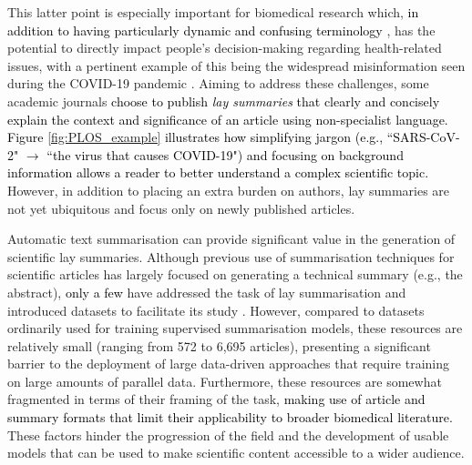 \documentclass[11pt]{article}
\begin{document}
This latter point is especially important for biomedical research which, \textcolor{black}{in addition to having particularly dynamic and confusing terminology \citep{SMITH2006288,peng2021named}}, has the potential to directly impact people's decision-making regarding health-related issues, with a pertinent example of this being the widespread misinformation seen during the COVID-19 pandemic \citep{Islam2020}.
Aiming to address these challenges, some academic journals 
\textcolor{black}{choose to publish \textit{lay summaries} that
clearly and concisely explain the context and significance of an article using non-specialist language. Figure \ref{fig:PLOS_example} illustrates how simplifying jargon (e.g., ``SARS-CoV-2" $\rightarrow$ ``the virus that causes COVID-19") and focusing on background information allows a reader to better understand a complex scientific topic.}
However, in addition to placing an extra burden on authors, lay summaries are not yet ubiquitous and focus only on newly published articles.





Automatic text summarisation can provide significant value in the generation of scientific lay summaries. 
Although previous use of summarisation techniques for scientific articles has largely focused on generating a technical summary (e.g., the abstract), \textcolor{black}{only a few} have addressed the task of lay summarisation and introduced datasets to facilitate its study \citep{Chandrasekaran2020-df, Guo2020-ba, Zaman2020-kx}. However, compared to datasets ordinarily used for training supervised summarisation models, these resources are relatively small (ranging from 572 to 6,695 articles), presenting a significant barrier to the deployment of large data-driven approaches that require training on large amounts of parallel data. Furthermore, these resources are somewhat fragmented in terms of their framing of the task, 
\textcolor{black}{making use of article and summary formats that limit their applicability to broader biomedical literature.} 
These factors hinder the progression of the field and the development of usable models that can be used to make scientific content accessible to a wider audience. 
\end{document}
